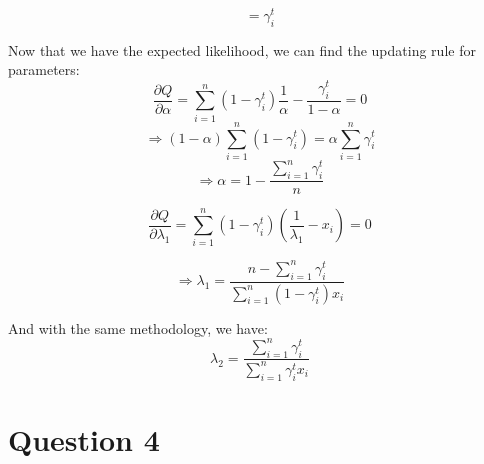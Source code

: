 \documentclass{article}
\begin{document}
\begin{equation*}
    = \gamma_i^t
\end{equation*}

Now that we have the expected likelihood, we can find the updating rule for parameters:
\begin{equation*}
    \frac{\partial Q}{\partial \alpha} = \sum_{i=1}^{n} (1-\gamma_i^t)\frac{1}{\alpha} - \frac{\gamma_i^t}{1-\alpha} = 0
\end{equation*}
\begin{equation*}
    \Rightarrow (1 - \alpha) \sum_{i=1}^{n}(1-\gamma_i^t) = \alpha \sum_{i=1}^{n} \gamma_i^t
\end{equation*}
\begin{equation*}
    \Rightarrow \alpha = 1 - \frac{\sum_{i=1}^{n} \gamma_i^t}{n}
\end{equation*}

\begin{equation*}
    \frac{\partial Q}{\partial \lambda_1} = \sum_{i=1}^{n}(1 - \gamma_i^t)(\frac{1}{\lambda_1} - x_i) = 0
\end{equation*}

\begin{equation*}
    \Rightarrow \lambda_1 = \frac{n - \sum_{i=1}^{n} \gamma_i^t}{\sum_{i=1}^{n}(1-\gamma_i^t)x_i}
\end{equation*}

And with the same methodology, we have:
\begin{equation*}
    \lambda_2 = \frac{\sum_{i=1}^{n} \gamma_i^t}{\sum_{i=1}^{n} \gamma_i^t x_i}
\end{equation*}


\section*{Question 4}
\end{document}
